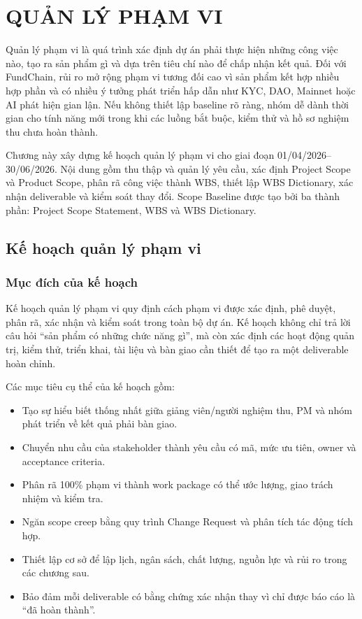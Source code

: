 \chapter{QUẢN LÝ PHẠM VI}

Quản lý phạm vi là quá trình xác định dự án phải thực hiện những công việc nào, tạo ra sản phẩm gì và dựa trên tiêu chí nào để chấp nhận kết quả. Đối với FundChain, rủi ro mở rộng phạm vi tương đối cao vì sản phẩm kết hợp nhiều hợp phần và có nhiều ý tưởng phát triển hấp dẫn như KYC, DAO, Mainnet hoặc AI phát hiện gian lận. Nếu không thiết lập baseline rõ ràng, nhóm dễ dành thời gian cho tính năng mới trong khi các luồng bắt buộc, kiểm thử và hồ sơ nghiệm thu chưa hoàn thành.

Chương này xây dựng kế hoạch quản lý phạm vi cho giai đoạn 01/04/2026--30/06/2026. Nội dung gồm thu thập và quản lý yêu cầu, xác định Project Scope và Product Scope, phân rã công việc thành WBS, thiết lập WBS Dictionary, xác nhận deliverable và kiểm soát thay đổi. Scope Baseline được tạo bởi ba thành phần: Project Scope Statement, WBS và WBS Dictionary.

\iffalse
\section{Kế hoạch quản lý phạm vi}

\subsection{Mục đích của kế hoạch}

Kế hoạch quản lý phạm vi quy định cách phạm vi được xác định, phê duyệt, phân rã, xác nhận và kiểm soát trong toàn bộ dự án. Kế hoạch không chỉ trả lời câu hỏi ``sản phẩm có những chức năng gì'', mà còn xác định các hoạt động quản trị, kiểm thử, triển khai, tài liệu và bàn giao cần thiết để tạo ra một deliverable hoàn chỉnh.

Các mục tiêu cụ thể của kế hoạch gồm:

\begin{itemize}
  \item Tạo sự hiểu biết thống nhất giữa giảng viên/người nghiệm thu, PM và nhóm phát triển về kết quả phải bàn giao.
  \item Chuyển nhu cầu của stakeholder thành yêu cầu có mã, mức ưu tiên, owner và acceptance criteria.
  \item Phân rã 100\% phạm vi thành work package có thể ước lượng, giao trách nhiệm và kiểm tra.
  \item Ngăn scope creep bằng quy trình Change Request và phân tích tác động tích hợp.
  \item Thiết lập cơ sở để lập lịch, ngân sách, chất lượng, nguồn lực và rủi ro trong các chương sau.
  \item Bảo đảm mỗi deliverable có bằng chứng xác nhận thay vì chỉ được báo cáo là ``đã hoàn thành''.
\end{itemize}

